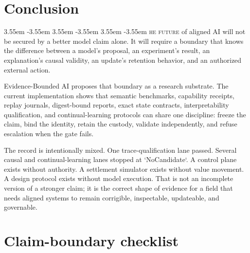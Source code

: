 \documentclass[11pt,twoside]{article}
\newcommand{\dropcap}[2]{%
  \noindent
  \parshape 4
    3.55em \dimexpr\linewidth-3.55em\relax
    3.55em \dimexpr\linewidth-3.55em\relax
    3.55em \dimexpr\linewidth-3.55em\relax
    0pt \linewidth
  \makebox[0pt][r]{%
    \raisebox{-1.48\baselineskip}[0pt][0pt]{%
      \fontsize{47}{47}\selectfont #1}%
    \hspace{0.16em}}%
  \textsc{#2}%
}
\begin{document}
\clearpage
\section{Conclusion}

\dropcap{T}{he future} of aligned AI will not be secured by a better model claim alone. It will require a boundary that knows the difference between a model's proposal, an experiment's result, an explanation's causal validity, an update's retention behavior, and an authorized external action.

  Evidence-Bounded AI proposes that boundary as a research substrate. The current implementation shows that semantic benchmarks, capability receipts, replay journals, digest-bound reports, exact state contracts, interpretability qualification, and continual-learning protocols can share one discipline: freeze the claim, bind the identity, retain the custody, validate independently, and refuse escalation when the gate fails.

  The record is intentionally mixed. One trace-qualification lane passed. Several causal and continual-learning lanes stopped at `NoCandidate`. A control plane exists without authority. A settlement simulator exists without value movement. A design protocol exists without model execution. That is not an incomplete version of a stronger claim; it is the correct shape of evidence for a field that needs aligned systems to remain corrigible, inspectable, updateable, and governable.

\appendix
\section{Claim-boundary checklist}
\end{document}
